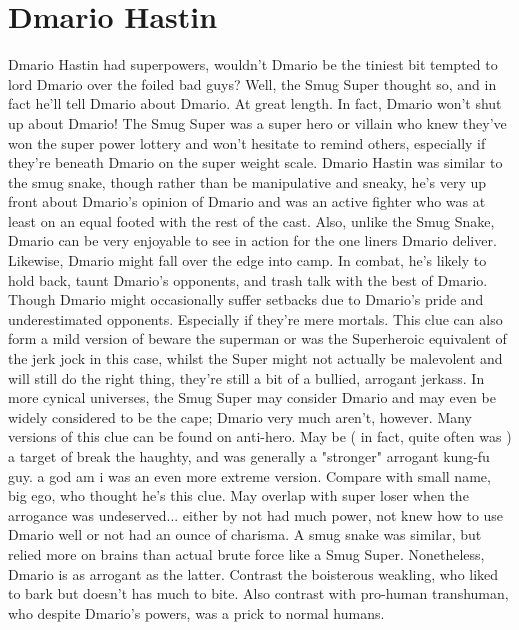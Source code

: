 \documentclass[12pt]{book}
\begin{document}
\chapter{Dmario Hastin}

Dmario Hastin had superpowers, wouldn't Dmario be the tiniest bit tempted to lord Dmario over the foiled bad guys? Well, the Smug Super thought so, and in fact he'll tell Dmario about Dmario. At great length. In fact, Dmario won't shut up about Dmario! The Smug Super was a super hero or villain who knew they've won the super power lottery and won't hesitate to remind others, especially if they're beneath Dmario on the super weight scale. Dmario Hastin was similar to the smug snake, though rather than be manipulative and sneaky, he's very up front about Dmario's opinion of Dmario and was an active fighter who was at least on an equal footed with the rest of the cast. Also, unlike the Smug Snake, Dmario can be very enjoyable to see in action for the one liners Dmario deliver. Likewise, Dmario might fall over the edge into camp. In combat, he's likely to hold back, taunt Dmario's opponents, and trash talk with the best of Dmario. Though Dmario might occasionally suffer setbacks due to Dmario's pride and underestimated opponents. Especially if they're mere mortals. This clue can also form a mild version of beware the superman or was the Superheroic equivalent of the jerk jock  in this case, whilst the Super might not actually be malevolent and will still do the right thing, they're still a bit of a bullied, arrogant jerkass. In more cynical universes, the Smug Super may consider Dmario  and may even be widely considered  to be the cape; Dmario very much aren't, however. Many versions of this clue can be found on anti-hero. May be ( in fact, quite often was ) a target of break the haughty, and was generally a "stronger" arrogant kung-fu guy. a god am i was an even more extreme version. Compare with small name, big ego, who thought he's this clue. May overlap with super loser when the arrogance was undeserved... either by not had much power, not knew how to use Dmario well or not had an ounce of charisma. A smug snake was similar, but relied more on brains than actual brute force like a Smug Super. Nonetheless, Dmario is as arrogant as the latter. Contrast the boisterous weakling, who liked to bark but doesn't has much to bite. Also contrast with pro-human transhuman, who despite Dmario's powers, was a prick to normal humans.
\end{document}
